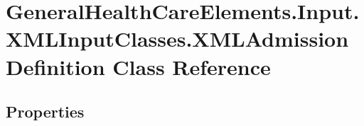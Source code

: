 \hypertarget{class_general_health_care_elements_1_1_input_1_1_x_m_l_input_classes_1_1_x_m_l_admission_definition}{}\section{General\+Health\+Care\+Elements.\+Input.\+X\+M\+L\+Input\+Classes.\+X\+M\+L\+Admission\+Definition Class Reference}
\label{class_general_health_care_elements_1_1_input_1_1_x_m_l_input_classes_1_1_x_m_l_admission_definition}
\subsection*{Properties}

